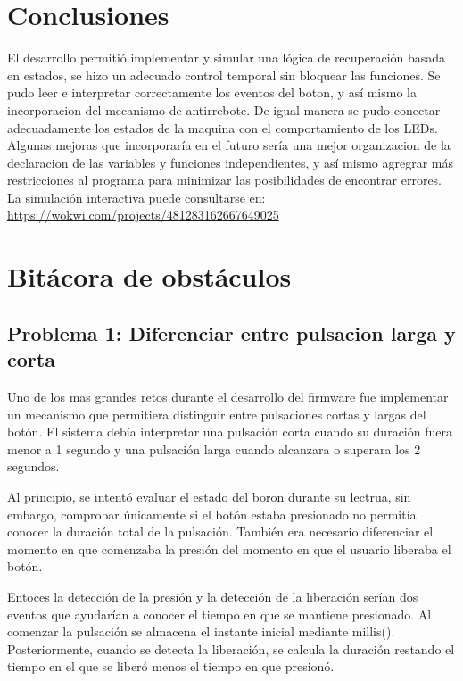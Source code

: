 \documentclass[10pt,a4paper]{article}
\begin{document}
\section{Conclusiones}

El desarrollo permitió implementar y simular una lógica
de recuperación basada en estados, se hizo un adecuado control temporal sin
bloquear las funciones. Se pudo leer e interpretar correctamente los eventos del boton, 
y así mismo la incorporacion del mecanismo de antirrebote. De igual manera se pudo conectar
adecuadamente los estados de la maquina con el comportamiento de los LEDs. Algunas mejoras que
incorporaría en el futuro sería una mejor organizacion de la declaracion de las variables y 
funciones independientes, y así mismo agregrar más restricciones al programa para minimizar
las posibilidades de encontrar errores.
La simulación interactiva puede consultarse en:
\url{https://wokwi.com/projects/481283162667649025}


\newpage

\section{Bitácora de obstáculos}

\subsection{Problema 1: Diferenciar entre pulsacion larga y corta}

Uno de los mas grandes retos durante el desarrollo del firmware fue implementar un mecanismo que permitiera distinguir entre pulsaciones cortas y largas del botón. El sistema debía interpretar una pulsación corta cuando su duración fuera menor a 1 segundo y una pulsación larga cuando alcanzara o superara los 2 segundos.

Al principio, se intentó evaluar el estado del boron durante su lectrua, sin embargo, comprobar únicamente si el botón estaba presionado no permitía conocer la duración total de la pulsación. También era necesario diferenciar el momento en que comenzaba la presión del momento en que el usuario liberaba el botón.

Entoces la detección de la presión y la detección de la liberación serían dos eventos que ayudarían a conocer el tiempo en que se mantiene presionado. Al comenzar la pulsación se almacena el instante inicial mediante millis(). Posteriormente, cuando se detecta la liberación, se calcula la duración restando el tiempo en el que se liberó menos el tiempo en que presionó. 
\end{document}
